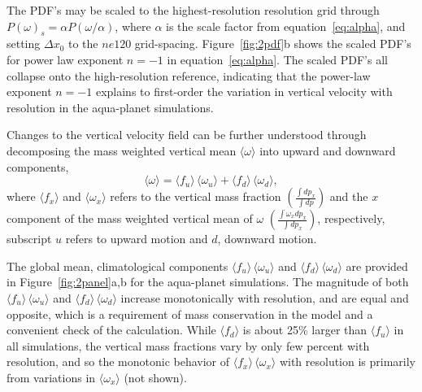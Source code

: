 \documentclass[times]{qjrms4}
\begin{document}
The PDF's may be scaled to the highest-resolution resolution grid through $P(\omega)_s = \alpha P (\omega / \alpha)$, where $\alpha$ is the scale factor from equation~\ref{eq:alpha}, and setting $\Delta x_0$ to the $ne120$ grid-spacing. Figure~\ref{fig:2pdf}b shows the scaled PDF's for power law exponent $n=-1$ in equation~\ref{eq:alpha}. The scaled PDF's all collapse onto the high-resolution reference, indicating that the power-law exponent $n=-1$ explains to first-order the variation in vertical velocity with resolution in the aqua-planet simulations. 

Changes to the vertical velocity field can be further understood through decomposing the mass weighted vertical mean $ \langle \omega \rangle$ into upward and downward components,
\begin{equation}
\langle \omega \rangle =\langle f_{u} \rangle \, \langle \omega_{u} \rangle + \langle f_{d} \rangle \, \langle \omega_{d} \rangle, \label{eq:omega}
\end{equation}
where $\langle f_x \rangle$ and $\langle \omega_x \rangle$ refers to the vertical mass fraction $ \left( \frac{\int dp_x}{\int dp} \right)$ and the $x$ component of the mass weighted vertical mean of $\omega$ $ \left( \frac{\int \omega_x dp_x}{\int dp_x} \right)$, respectively, subscript $u$ refers to upward motion and $d$, downward motion.

The global mean, climatological components $\langle f_{u} \rangle \, \langle \omega_{u} \rangle$ and $\langle f_{d} \rangle \, \langle \omega_{d} \rangle$ are provided in Figure~\ref{fig:2panel}a,b for the aqua-planet simulations. The magnitude of both $\langle f_{u} \rangle \, \langle \omega_{u} \rangle$ and $\langle f_{d} \rangle \, \langle \omega_{d} \rangle$ increase monotonically with resolution, and are equal and opposite, which is a requirement of mass conservation in the model and a convenient check of the calculation. While $\langle f_{d} \rangle$ is about 25\% larger than $\langle f_{u} \rangle$ in all simulations, the vertical mass fractions vary by only few percent with resolution, and so the monotonic behavior of $\langle f_{x} \rangle \, \langle \omega_{x} \rangle$ with resolution is primarily from variations in $ \langle \omega_{x} \rangle$ (not shown).
\end{document}
